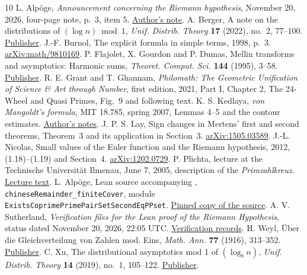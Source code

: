\begin{thebibliography}{10}
 L. Alpöge,
\emph{Announcement concerning the Riemann hypothesis},
November 20, 2026, four-page note, p.~3, item 5.
\href{https://alpo.ge/remark.pdf}{Author's note}.
 A. Berger, A note on the distributions of $(\log n)\bmod 1$,
\emph{Unif. Distrib. Theory} \textbf{17} (2022), no.~2, 77--100.
\href{https://doi.org/10.2478/udt-2022-0013}{Publisher}.
 J.-F. Burnol, The explicit formula in simple terms,
1998, p.~3. \href{https://arxiv.org/abs/math/9810169}{arXiv:math/9810169}.
 P. Flajolet, X. Gourdon and P. Dumas,
Mellin transforms and asymptotics: Harmonic sums,
\emph{Theoret. Comput. Sci.} \textbf{144} (1995), 3--58.
\href{https://doi.org/10.1016/0304-3975(95)00002-E}{Publisher}.
 R. E. Grant and T. Ghannam,
\emph{Philomath: The Geometric Unification of Science \& Art through
Number}, first edition, 2021, Part I, Chapter 2, The 24-Wheel and
Quasi Primes, Fig.~9 and following text.
 K. S. Kedlaya, \emph{von Mangoldt's formula},
MIT 18.785, spring 2007, Lemmas 4--5 and the contour estimates.
\href{https://kskedlaya.org/18.785/von-mangoldt.pdf}{Author's notes}.
 J. P. S. Lay, Sign changes in Mertens' first and second
theorems, Theorem~3 and its application in Section~3.
\href{https://arxiv.org/abs/1505.03589}{arXiv:1505.03589}.
 J.-L. Nicolas, Small values of the Euler function and
the Riemann hypothesis, 2012, (1.18)--(1.19) and Section~4.
\href{https://arxiv.org/abs/1202.0729}{arXiv:1202.0729}.
 P. Plichta, lecture at the Technische Universität
Ilmenau, June 7, 2005, description of the \emph{Primzahlkreuz}.
\href{https://www.plichta.de/plichta/vortrag-in-illmenau/gehalten-an-der-uni-illmenau-am-7-6-05}{Lecture text}.
 L. Alpöge, Lean source accompanying \cite{alpoge},
\texttt{chineseRemainder\_finiteCover}, module
\texttt{ExistsCoprimePrimePairSetSecondEqPPset}.
\href{https://github.com/Deicyde/riemann-hypothesis/blob/371a1a26d5e17f604428e3a8ce6ce341cf517434/src/Development/AutomorphicArithmetic/MeanSquareBounds/ExistsCoprimePrimePairSetSecondEqPPset.lean}{Pinned copy of the source}.
 A. V. Sutherland,
\emph{Verification files for the Lean proof of the Riemann Hypothesis},
status dated November 20, 2026, 22:05 UTC.
\href{https://math.mit.edu/~drew/grh/}{Verification records}.
 H. Weyl, \"Uber die Gleichverteilung von Zahlen mod.
Eins, \emph{Math. Ann.} \textbf{77} (1916), 313--352.
\href{https://doi.org/10.1007/BF01475864}{Publisher}.
 C. Xu, The distributional asymptotics mod 1 of
$(\log_b n)$, \emph{Unif. Distrib. Theory} \textbf{14} (2019),
no.~1, 105--122.
\href{https://doi.org/10.2478/udt-2019-0007}{Publisher}.
\end{thebibliography}
